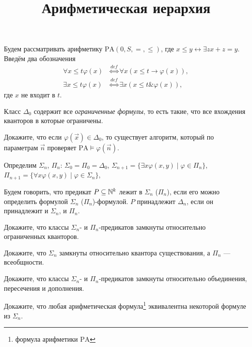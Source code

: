 \documentclass[a4paper, 12pt, num=Г2]{listok}
\renewcommand{\phi}{\varphi}
\begin{document}
\title{Арифметическая иерархия}
\maketitle
Будем рассматривать арифметику $\mathrm{PA}(0, S, =, \le)$,
где $x \le y \leftrightarrow \exists z x + z = y$.
Введём два обозначения
\begin{align*}
	\forall{x \le t}\phi(x) & \stackrel{def}{\Leftrightarrow} \forall x (x \le t \to \phi(x)), \\
	\exists{x \le t}\phi(x) & \stackrel{def}{\Leftrightarrow} \exists x (x \le t \&  \phi(x)),
\end{align*}
где $x$ не входит в $t$.
\begin{definition}
	Класс $\Delta_0$ содержит все \textit{ограниченные формулы},
	то есть такие, что все вхождения кванторов в которые ограничены.
\end{definition}
\begin{problem}
	Докажите, что если $\phi(\vec x) \in \Delta_0$, то существует алгоритм,
	который по параметрам $\vec n$ проверяет $\mathrm{PA} \models \phi(\vec n)$.
\end{problem}
\begin{definition}
	Определим $\Sigma_n$, $\Pi_n$:
	$\Sigma_0 = \Pi_0 = \Delta_0$,
	$\Sigma_{n + 1} = \{ \exists x \phi(x, y) \mid \phi \in \Pi_n \}$,
	$\Pi_{n + 1} = \{ \forall x \phi(x, y) \mid \phi \in \Sigma_n \}$,
\end{definition}
\begin{definition}
	Будем говорить, что предикат $P \subseteq \mathbb{N}^k$ лежит в $\Sigma_n$ ($\Pi_n$),
	если его можно определить формулой $\Sigma_n$ ($\Pi_n$)-формулой.
	$P$ принадлежит $\Delta_n$, если он принадлежит и $\Sigma_n$, и $\Pi_n$.
\end{definition}
\begin{problem}
	Докажите, что классы $\Sigma_n$- и $\Pi_n$-предикатов замкнуты относительно ограниченных кванторов.
\end{problem}
\begin{problem}
	Докажите, что $\Sigma_n$ замкнуты относительно квантора существования, а $\Pi_n$ --- всеобщности.
\end{problem}
\begin{problem}
	Докажите, что классы $\Sigma_n$- и $\Pi_n$-предикатов замкнуты относительно объединения, пересечения и дополнения.
\end{problem}
\begin{problem}
	Докажите, что любая арифметическая формула\footnote{формула арифметики $\mathrm{PA}$} эквивалентна некоторой формуле из $\Sigma_n$.
\end{problem}
\end{document}

